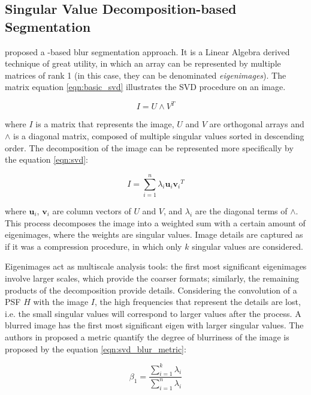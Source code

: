 \subsection{Singular Value Decomposition-based Segmentation}

 proposed a 
-based blur segmentation approach. It is a Linear Algebra derived technique of great utility, in which an array can be represented by multiple matrices of rank 1 (in this case, they can be denominated \emph{eigenimages}). The matrix equation \ref{eqn:basic_svd}
illustrates the SVD procedure on an image.

\begin{equation}
\label{eqn:basic_svd}
	I = U{\wedge}V^{T}
\end{equation}

\noindent where $I$ is a matrix that represents the image, $U$ and $V$ are orthogonal arrays and $\wedge$ is a diagonal matrix, composed of multiple singular values sorted in descending order. The decomposition of the image can be represented more specifically by the equation \ref{eqn:svd}:

\begin{equation}
\label{eqn:svd}
	I = \sum_{i=1}^{n}\lambda_{i}{\mathbf{u}_i}{\mathbf{v}_i}^{T}
\end{equation}

\noindent where $\mathbf{u}_i$, $\mathbf{v}_i$ are column vectors of $U$ and $V$, and $\lambda_{i}$ are the diagonal terms of $\wedge$. This process decomposes the image into a weighted sum with a certain amount of eigenimages, where the weights are singular values. Image details are captured as if it was a compression procedure, in which only $k$ singular values are considered.

Eigenimages act as multiscale analysis tools: the first most significant eigenimages involve larger scales, which provide the coarser formats; similarly, the remaining products of the decomposition provide details. Considering the convolution of a PSF $H$ with the image $I$, the high frequencies that represent the details are lost, i.e. the small singular values will correspond to larger values after the process. A blurred image has the first most significant eigen with larger singular values. The authors in  proposed a metric quantify the degree of blurriness of the image is proposed by the equation \ref{eqn:svd_blur_metric}:

\begin{equation}
\label{eqn:svd_blur_metric}
	\beta_{1} = \frac{\sum_{i=1}^{k}\lambda_{i}}{\sum_{i=1}^{n}\lambda_{i}}
\end{equation}

